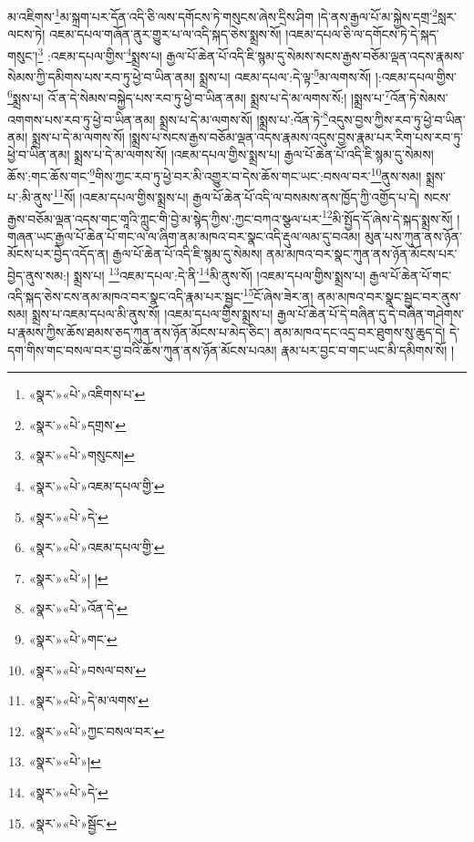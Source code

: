 མ་འཇིགས་\footnote{«སྣར་»«པེ་»འཇིགས་པ་}མ་སྐྲག་པར་དོན་འདི་ཅི་ལས་དགོངས་ཏེ་གསུངས་ཞེས་དྲིས་ཤིག །དེ་ནས་རྒྱལ་པོ་མ་སྐྱེས་དགྲ་\footnote{«སྣར་»«པེ་»དགྲས་}སླར་ལངས་ཏེ། འཇམ་དཔལ་གཞོན་ནུར་གྱུར་པ་ལ་འདི་སྐད་ཅེས་སྨྲས་སོ། །འཇམ་དཔལ་ཅི་ལ་དགོངས་ཏེ་དེ་སྐད་གསུང་།\footnote{«སྣར་»«པེ་»གསུངས།} :འཇམ་དཔལ་གྱིས་\footnote{«སྣར་»«པེ་»འཇམ་དཔལ་གྱི་}སྨྲས་པ། རྒྱལ་པོ་ཆེན་པོ་འདི་ཇི་སྙམ་དུ་སེམས་སངས་རྒྱས་བཅོམ་ལྡན་འདས་རྣམས་སེམས་ཀྱི་དམིགས་པས་རབ་ཏུ་ཕྱེ་བ་ཡིན་ནམ། སྨྲས་པ། འཇམ་དཔལ་:དེ་ལྟ་\footnote{«སྣར་»«པེ་»དེ་}མ་ལགས་སོ། །:འཇམ་དཔལ་གྱིས་\footnote{«སྣར་»«པེ་»འཇམ་དཔལ་གྱི་}སྨྲས་པ། འོ་ན་དེ་སེམས་བསྐྱེད་པས་རབ་ཏུ་ཕྱེ་བ་ཡིན་ནམ། སྨྲས་པ་དེ་མ་ལགས་སོ:། །སྨྲས་པ་\footnote{«སྣར་»«པེ་»། །}འོན་ཏེ་སེམས་འགགས་པས་རབ་ཏུ་ཕྱེ་བ་ཡིན་ནམ། སྨྲས་པ་དེ་མ་ལགས་སོ། །སྨྲས་པ་:འོན་ཏེ་\footnote{«སྣར་»«པེ་»འོན་དེ་}འདུས་བྱས་ཀྱིས་རབ་ཏུ་ཕྱེ་བ་ཡིན་ནམ། སྨྲས་པ་དེ་མ་ལགས་སོ། །སྨྲས་པ་སངས་རྒྱས་བཅོམ་ལྡན་འདས་རྣམས་འདུས་བྱས་རྣམ་པར་རིག་པས་རབ་ཏུ་ཕྱེ་བ་ཡིན་ནམ། སྨྲས་པ་དེ་མ་ལགས་སོ། །འཇམ་དཔལ་གྱིས་སྨྲས་པ། རྒྱལ་པོ་ཆེན་པོ་འདི་ཇི་སྙམ་དུ་སེམས། ཆོས་:གང་ཆོས་གང་\footnote{«སྣར་»«པེ་»གང་}གིས་ཀྱང་རབ་ཏུ་ཕྱེ་བར་མི་འགྱུར་བ་དེས་ཆོས་གང་ཡང་:བསལ་བར་\footnote{«སྣར་»«པེ་»བསལ་བས་}ནུས་སམ། སྨྲས་པ་:མི་ནུས་\footnote{«སྣར་»«པེ་»དེ་མ་ལགས་}སོ། །འཇམ་དཔལ་གྱིས་སྨྲས་པ། རྒྱལ་པོ་ཆེན་པོ་འདི་ལ་བསམས་ནས་ཁྱོད་ཀྱི་འགྱོད་པ་དེ། སངས་རྒྱས་བཅོམ་ལྡན་འདས་གང་གཱའི་ཀླུང་གི་བྱེ་མ་སྙེད་ཀྱིས་:ཀྱང་བཀའ་སྩལ་པར་\footnote{«སྣར་»«པེ་»ཀྱང་བསལ་བར་}མི་སྤྱོད་དོ་ཞེས་དེ་སྐད་སྨྲས་སོ། །གཞན་ཡང་རྒྱལ་པོ་ཆེན་པོ་གང་ལ་ལ་ཞིག་ནམ་མཁའ་བར་སྣང་འདི་རྡུལ་ལམ་དུ་བའམ། མུན་པས་ཀུན་ནས་ཉོན་མོངས་པར་བྱེད་འདོད་ན། རྒྱལ་པོ་ཆེན་པོ་འདི་ཇི་སྙམ་དུ་སེམས། ནམ་མཁའ་བར་སྣང་ཀུན་ནས་ཉོན་མོངས་པར་བྱེད་ནུས་སམ:། སྨྲས་པ། \footnote{«སྣར་»«པེ་»།  }འཇམ་དཔལ་:དེ་ནི་\footnote{«སྣར་»«པེ་»དེ་}མི་ནུས་སོ། །འཇམ་དཔལ་གྱིས་སྨྲས་པ། རྒྱལ་པོ་ཆེན་པོ་གང་འདི་སྐད་ཅེས་ངས་ནམ་མཁའ་བར་སྣང་འདི་རྣམ་པར་སྦྱང་\footnote{«སྣར་»«པེ་»སྦྱོང་}ངོ་ཞེས་ཟེར་ན། ནམ་མཁའ་བར་སྣང་སྦྱང་བར་ནུས་སམ། སྨྲས་པ་འཇམ་དཔལ་མི་ནུས་སོ། །འཇམ་དཔལ་གྱིས་སྨྲས་པ། རྒྱལ་པོ་ཆེན་པོ་དེ་བཞིན་དུ་དེ་བཞིན་གཤེགས་པ་རྣམས་ཀྱིས་ཆོས་ཐམས་ཅད་ཀུན་ནས་ཉོན་མོངས་པ་མེད་ཅིང་། ནམ་མཁའ་དང་འདྲ་བར་ཐུགས་སུ་ཆུད་དེ། དེ་དག་གིས་གང་བསལ་བར་བྱ་བའི་ཆོས་ཀུན་ནས་ཉོན་མོངས་པའམ། རྣམ་པར་བྱང་བ་གང་ཡང་མི་དམིགས་སོ། །
